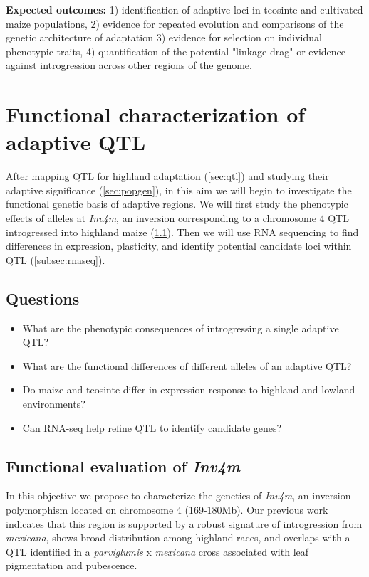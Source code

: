 {\bf Expected outcomes:} 1) identification of adaptive loci in teosinte and cultivated maize populations, 2) evidence for repeated evolution and comparisons of the genetic architecture of adaptation 3) evidence for selection on individual phenotypic traits, 4) quantification of the potential "linkage drag" or evidence against introgression across other regions of the genome.

\section{Functional characterization of adaptive QTL} \label{sec:funchar}

After mapping QTL for highland adaptation (\ref{sec:qtl}) and studying their adaptive significance (\ref{sec:popgen}), in this aim we will begin to investigate the functional genetic basis of adaptive regions.  We will first study the phenotypic effects of alleles at \emph{Inv4m}, an inversion corresponding to a chromosome 4 QTL introgressed into highland maize  (\ref{subsec:nils}).  Then we will use RNA sequencing to find differences in expression, plasticity, and identify potential candidate loci within QTL (\ref{subsec:rnaseq}).

\subsection*{Questions}
\begin{itemize}[topsep=0pt,itemsep=-1ex,partopsep=1ex,parsep=1ex]
\item What are the phenotypic consequences of introgressing a single adaptive QTL?
\item What are the functional differences of different alleles of an adaptive QTL?
\item Do maize and teosinte differ in expression response to highland and lowland environments?
\item Can RNA-seq help refine QTL to identify candidate genes?
\end{itemize}

\subsection{Functional evaluation of \emph{Inv4m}} \label{subsec:nils}

In this objective we propose to characterize the genetics of \emph{Inv4m}, an inversion polymorphism located on chromosome 4 (169-180Mb). Our previous work \citep{Hufford2013, Pyhajarvi2013} indicates that this region is supported by a robust signature of introgression from \emph{mexicana}, shows broad distribution among highland races, and overlaps with a QTL identified in a \emph{parviglumis} x \emph{mexicana} cross  \citep{Lauter2004a} associated with leaf pigmentation and pubescence. %

